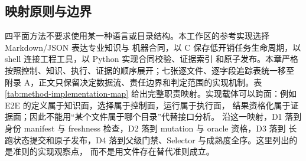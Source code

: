 \documentclass[UTF8,a4paper,zihao=-4,oneside]{ctexart}
\begin{document}
\subsection{映射原则与边界}

四平面方法不要求使用某一种语言或目录结构。本工作区的参考实现选择 Markdown/JSON 表达专业知识与
机器合同，以 C 保存低开销任务生命周期，以 shell 连接工程工具，以 Python 实现合同校验、证据索引
和原子发布。本章严格按照控制、知识、执行、证据的顺序展开；七张逐文件、逐字段追踪表统一移至
附录 A，正文只保留决定数据流、责任边界和判定范围的实现机制。表\ref{tab:method-implementation-map}
给出完整职责映射。实现载体可以跨面：例如 E2E 的定义属于知识面，选择属于控制面，运行属于执行面，
结果资格化属于证据面；因此不能用“某个文件属于哪个目录”代替接口分析。
沿这一映射，D1 落到身份 manifest 与 freshness 检查，D2 落到 mutation 与 oracle 资格，D3 落到
长跑状态提交和原子发布，D4 落到父级门禁、Selector 与成熟度全序。这里列出的是准则的实现观察点，
而不是用文件存在替代准则成立。
\end{document}

